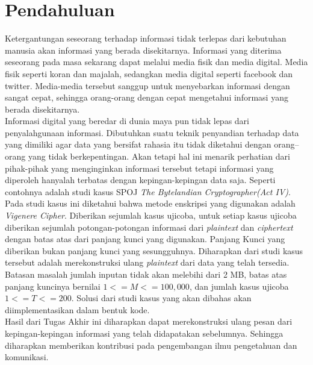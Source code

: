 \section{Pendahuluan}
Ketergantungan seseorang terhadap informasi tidak terlepas dari kebutuhan manusia akan informasi yang berada disekitarnya. Informasi yang diterima seseorang pada masa sekarang dapat melalui media fisik dan media digital. Media fisik seperti koran dan majalah, sedangkan media digital seperti facebook dan twitter. Media-media tersebut sanggup untuk menyebarkan informasi dengan sangat cepat, sehingga orang-orang dengan cepat mengetahui informasi yang berada disekitarnya.
\\
\indent Informasi digital yang beredar di dunia maya pun tidak lepas dari penyalahgunaan informasi. Dibutuhkan suatu teknik penyandian terhadap data yang dimiliki agar data yang bersifat rahasia itu tidak diketahui dengan orang–orang yang tidak berkepentingan. Akan tetapi hal ini menarik perhatian dari pihak-pihak yang menginginkan informasi tersebut tetapi informasi yang diperoleh hanyalah terbatas dengan kepingan-kepingan data saja. Seperti contohnya adalah studi kasus SPOJ \textit{The Bytelandian Cryptographer(Act IV)}. Pada studi kasus ini diketahui bahwa metode enskripsi yang digunakan adalah \textit{Vigenere Cipher}. Diberikan sejumlah kasus ujicoba, untuk setiap kasus ujicoba diberikan sejumlah potongan-potongan informasi dari \textit{plaintext} dan \textit{ciphertext} dengan batas atas dari panjang kunci yang digunakan. Panjang Kunci yang diberikan bukan panjang kunci yang sesungguhnya. Diharapkan dari studi kasus tersebut adalah merekonstruksi ulang \textit{plaintext} dari data yang telah tersedia. Batasan masalah jumlah inputan tidak akan melebihi dari 2 MB, batas atas panjang kuncinya bernilai $1<=M<=100,000$, dan jumlah kasus ujicoba $1<=T<=200$. Solusi dari studi kasus yang akan dibahas akan diimplementasikan dalam bentuk kode. 
\\
\indent Hasil dari Tugas Akhir ini diharapkan dapat merekonstruksi ulang pesan dari kepingan-kepingan informasi yang telah didapatakan sebelumnya. Sehingga diharapkan memberikan kontribusi pada pengembangan ilmu pengetahuan dan komunikasi. 

